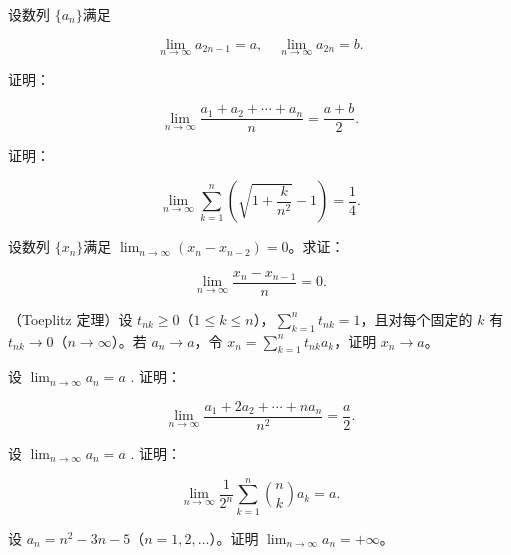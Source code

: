 \noindent\begin{minipage}{\textwidth}
设数列 $ \{a_{n}\} $满足

\[\lim_{n\to\infty}a_{2n-1}=a,\quad\lim_{n\to\infty}a_{2n}=b.\]

证明：

\[\lim_{n\to\infty}\frac{a_{1}+a_{2}+\cdots+a_{n}}{n}=\frac{a+b}{2}.\]
\end{minipage}\par\vfill
\newpage
\noindent\begin{minipage}{\textwidth}
证明：

\[\lim_{n\to\infty}\sum_{k=1}^{n}\left(\sqrt{1+\frac{k}{n^{2}}}-1\right)=\frac{1}{4}.\]
\end{minipage}\par\vfill
\noindent\begin{minipage}{\textwidth}
设数列 $ \{x_{n}\} $满足 $ \lim_{n\to\infty}(x_{n}-x_{n-2})=0 $。求证：

\[\lim_{n\to\infty}\frac{x_n-x_{n-1}}{n}=0.\]
\end{minipage}\par\vfill
\noindent\begin{minipage}{\textwidth}
（Toeplitz 定理）设 $t_{nk}\ge0$（$1\le k\le n$），$\sum_{k=1}^nt_{nk}=1$，且对每个固定的 $k$ 有 $t_{nk}\to0$（$n\to\infty$）。若 $a_n\to a$，令 $x_n=\sum_{k=1}^nt_{nk}a_k$，证明 $x_n\to a$。
\end{minipage}\par\vfill
\newpage
\noindent\begin{minipage}{\textwidth}
设  $ \lim_{n\to\infty}a_n=a $ . 证明：

\[\lim_{n\to\infty}\frac{a_{1}+2a_{2}+\cdots+na_{n}}{n^{2}}=\frac{a}{2}.\]
\end{minipage}\par\vfill
\noindent\begin{minipage}{\textwidth}
设  $ \lim_{n\to\infty}a_n=a $ . 证明：

\[\lim_{n\to\infty}\frac{1}{2^n}\sum_{k=1}^{n}\binom{n}{k}a_k=a.\]
\end{minipage}\par\vfill
\noindent\begin{minipage}{\textwidth}
设 $a_n=n^2-3n-5$（$n=1,2,\ldots$）。证明 $\lim_{n\to\infty}a_n=+\infty$。
\end{minipage}\par\vfill
